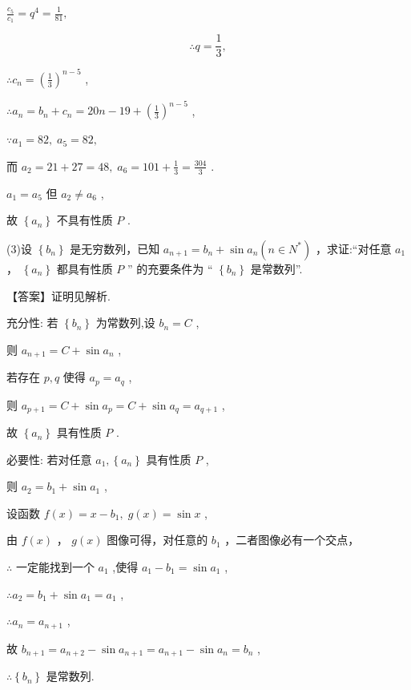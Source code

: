 \documentclass[10pt]{article}
\begin{document}
\(\frac{{c}_{5}}{{c}_{1}} = {q}^{4} = \frac{1}{81},\)

\[
\therefore q = \frac{1}{3},
\]

\(\therefore {c}_{n} = {\left( \frac{1}{3}\right) }^{n - 5}\) ,

\(\therefore {a}_{n} = {b}_{n} + {c}_{n} = {20n} - {19} + {\left( \frac{1}{3}\right) }^{n - 5}\) ,

\(\because {a}_{1} = {82},\;{a}_{5} = {82},\)

而 \({a}_{2} = {21} + {27} = {48},\;{a}_{6} = {101} + \frac{1}{3} = \frac{304}{3}\) .

\({a}_{1} = {a}_{5}\) 但 \({a}_{2} \neq  {a}_{6}\) ,

故 \(\left\{  {a}_{n}\right\}\) 不具有性质 \(P\) .

(3)设 \(\left\{  {b}_{n}\right\}\) 是无穷数列，已知 \({a}_{n + 1} = {b}_{n} + \sin {a}_{n}\left( {n \in  {N}^{ * }}\right)\) ，求证:“对任意 \({a}_{1}\) ， \(\left\{  {a}_{n}\right\}\) 都具有性质 \(P\) ” 的充要条件为 “ \(\left\{  {b}_{n}\right\}\) 是常数列”.

【答案】证明见解析.

充分性: 若 \(\left\{  {b}_{n}\right\}\) 为常数列,设 \({b}_{n} = C\) ,

则 \({a}_{n + 1} = C + \sin {a}_{n}\) ,

若存在 \(p,q\) 使得 \({a}_{p} = {a}_{q}\) ,

则 \({a}_{p + 1} = C + \sin {a}_{p} = C + \sin {a}_{q} = {a}_{q + 1}\) ,

故 \(\left\{  {a}_{n}\right\}\) 具有性质 \(P\) .

必要性: 若对任意 \({a}_{1},\left\{  {a}_{n}\right\}\) 具有性质 \(P\) ,

则 \({a}_{2} = {b}_{1} + \sin {a}_{1}\) ,

设函数 \(f\left( x\right)  = x - {b}_{1},\;g\left( x\right)  = \sin x\) ,

由 \(f\left( x\right)\) ， \(g\left( x\right)\) 图像可得，对任意的 \({b}_{1}\) ，二者图像必有一个交点，

\(\therefore\) 一定能找到一个 \({a}_{1}\) ,使得 \({a}_{1} - {b}_{1} = \sin {a}_{1}\) ,

\(\therefore {a}_{2} = {b}_{1} + \sin {a}_{1} = {a}_{1}\) ,

\(\therefore {a}_{n} = {a}_{n + 1}\) ,

故 \({b}_{n + 1} = {a}_{n + 2} - \sin {a}_{n + 1} = {a}_{n + 1} - \sin {a}_{n} = {b}_{n}\) ,

\(\therefore \left\{  {b}_{n}\right\}\) 是常数列.
\end{document}
